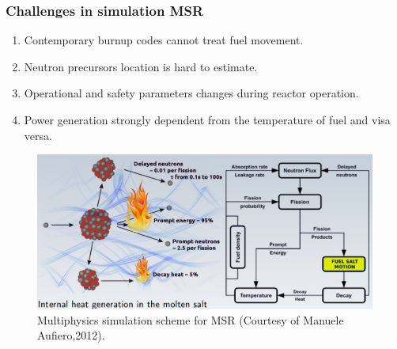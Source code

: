 \begin{frame}
  \frametitle{Challenges in simulation \gls{MSR}}
                  \vspace*{-0.05in}
               \begin{enumerate}
                \item Contemporary burnup codes cannot treat fuel movement.
                \item Neutron precursors location is hard to estimate.
                \item Operational and safety parameters changes during reactor operation.
                \item Power generation strongly dependent from the temperature of fuel and visa versa.
               \end{enumerate}

           \begin{figure}[t]
                \vspace*{-0.3in}
			\hspace*{-0.2in}
                \includegraphics[height=0.5\textwidth]{./images/coupled_physics.png}
		\vspace*{-0.05in}
		\caption{Multiphysics simulation scheme for \gls{MSR} (Courtesy of Manuele Aufiero,2012).}
     	 \end{figure}               
\end{frame}

